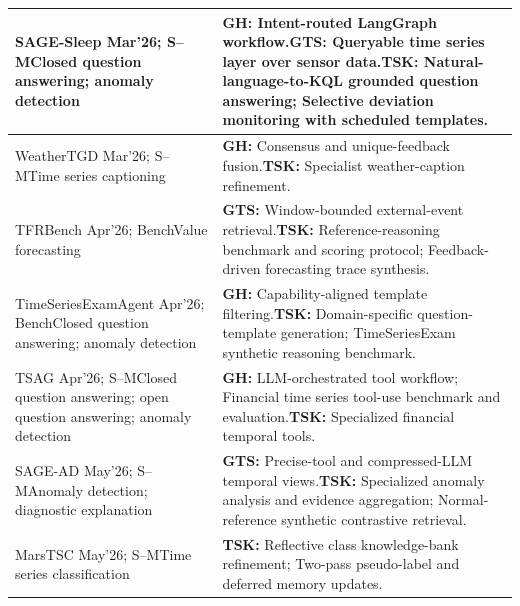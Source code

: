 \documentclass[preprints,article,submit,moreauthors]{Definitions/mdpi}
\newcommand{\typeSMshort}{\textsf{S--M}}
\newcommand{\typeBenchshort}{\textsf{Bench}}
\begin{document}
\begin{longtable}{@{}>{\raggedright\arraybackslash}p{}p{}@{}}
SAGE-Sleep \citep{sagesleep2026} Mar'26; \typeSMshort{}\newline Closed question answering; anomaly detection & \textbf{GH:} Intent-routed LangGraph workflow.\newline\textbf{GTS:} Queryable time series layer over sensor data.\newline\textbf{TSK:} Natural-language-to-KQL grounded question answering; Selective deviation monitoring with scheduled templates.\\\midrule
WeatherTGD \citep{weathertgd2026} Mar'26; \typeSMshort{}\newline Time series captioning & \textbf{GH:} Consensus and unique-feedback fusion.\newline\textbf{TSK:} Specialist weather-caption refinement.\\\midrule
TFRBench \citep{tfrbench2026} Apr'26; \typeBenchshort{}\newline Value forecasting & \textbf{GTS:} Window-bounded external-event retrieval.\newline\textbf{TSK:} Reference-reasoning benchmark and scoring protocol; Feedback-driven forecasting trace synthesis.\\\midrule
TimeSeries\allowbreak Exam\allowbreak Agent \citep{timeseriesexamagent2026} Apr'26; \typeBenchshort{}\newline Closed question answering; anomaly detection & \textbf{GH:} Capability-aligned template filtering.\newline\textbf{TSK:} Domain-specific question-template generation; TimeSeriesExam synthetic reasoning benchmark.\\\midrule
TSAG \citep{tsag2026} Apr'26; \typeSMshort{}\newline Closed question answering; open question answering; anomaly detection & \textbf{GH:} LLM-orchestrated tool workflow; Financial time series tool-use benchmark and evaluation.\newline\textbf{TSK:} Specialized financial temporal tools.\\\midrule
SAGE-AD \citep{sagead2026} May'26; \typeSMshort{}\newline Anomaly detection; diagnostic explanation & \textbf{GTS:} Precise-tool and compressed-LLM temporal views.\newline\textbf{TSK:} Specialized anomaly analysis and evidence aggregation; Normal-reference synthetic contrastive retrieval.\\\midrule
MarsTSC \citep{marstsc2026} May'26; \typeSMshort{}\newline Time series classification & \textbf{TSK:} Reflective class knowledge-bank refinement; Two-pass pseudo-label and deferred memory updates.\\\midrule

\end{longtable}
\end{document}
